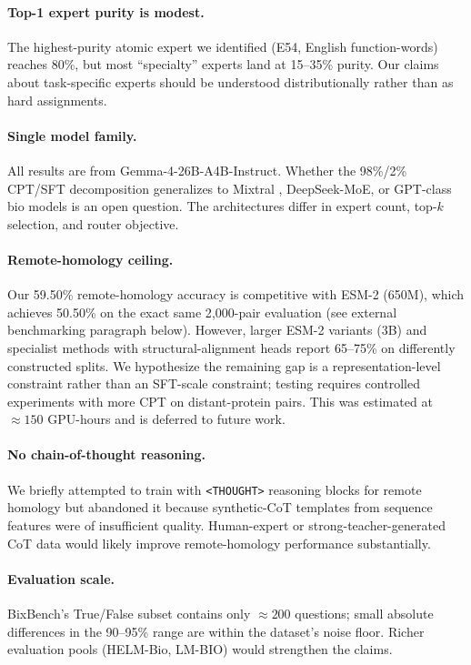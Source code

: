 \documentclass[11pt]{article}
\begin{document}
\paragraph{Top-1 expert purity is modest.} The highest-purity atomic expert we identified (E54, English function-words) reaches 80\%, but most ``specialty'' experts land at 15--35\% purity. Our claims about task-specific experts should be understood distributionally rather than as hard assignments.

\paragraph{Single model family.} All results are from Gemma-4-26B-A4B-Instruct. Whether the 98\%/2\% CPT/SFT decomposition generalizes to Mixtral \citep{jiang2024mixtral}, DeepSeek-MoE, or GPT-class bio models is an open question. The architectures differ in expert count, top-$k$ selection, and router objective.

\paragraph{Remote-homology ceiling.} Our 59.50\% remote-homology accuracy is competitive with ESM-2 (650M), which achieves 50.50\% on the exact same 2{,}000-pair evaluation (see external benchmarking paragraph below). However, larger ESM-2 variants (3B) and specialist methods with structural-alignment heads report 65--75\% on differently constructed splits. We hypothesize the remaining gap is a representation-level constraint rather than an SFT-scale constraint; testing requires controlled experiments with more CPT on distant-protein pairs. This was estimated at $\approx 150$ GPU-hours and is deferred to future work.

\paragraph{No chain-of-thought reasoning.} We briefly attempted to train with \texttt{<THOUGHT>} reasoning blocks for remote homology but abandoned it because synthetic-CoT templates from sequence features were of insufficient quality. Human-expert or strong-teacher-generated CoT data would likely improve remote-homology performance substantially.

\paragraph{Evaluation scale.} BixBench's True/False subset contains only $\approx 200$ questions; small absolute differences in the 90--95\% range are within the dataset's noise floor. Richer evaluation pools (HELM-Bio, LM-BIO) would strengthen the claims.
\end{document}
